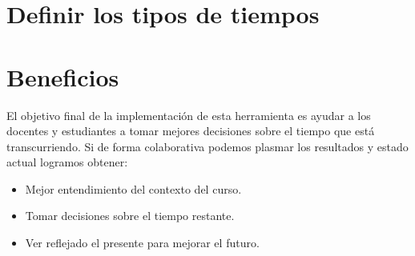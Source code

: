 \section{Definir los tipos de tiempos}

\section{Beneficios}
El objetivo final de la implementaci\'on de esta herramienta es ayudar a los docentes y estudiantes a tomar mejores decisiones sobre el tiempo que est\'a
transcurriendo. Si de forma colaborativa podemos plasmar los resultados y estado actual logramos obtener:
\begin{itemize}
 \item Mejor entendimiento del contexto del curso.
 \item Tomar decisiones sobre el tiempo restante.
 \item Ver reflejado el presente para mejorar el futuro.
\end{itemize}


